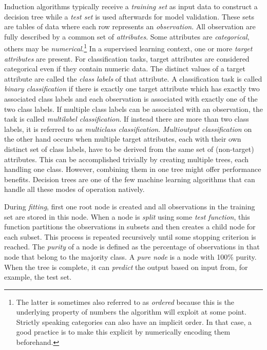 Induction algorithms typically receive a \emph{training set} as input data to construct a decision tree while a \emph{test set} is used afterwards for model validation. These sets are tables of data where each row represents an \emph{observation}. All observation are fully described by a common set of \emph{attributes}. Some attributes are \emph{categorical}, others may be \emph{numerical}.\footnote{The latter is sometimes also referred to as \emph{ordered} because this is the underlying property of numbers the algorithm will exploit at some point. Strictly speaking categories can also have an implicit order. In that case, a good practice is to make this explicit by numerically encoding them beforehand.} In a supervised learning context, one or more \emph{target attributes} are present. For classification tasks, target attributes are considered categorical even if they contain numeric data. The distinct values of a target attribute are called the \emph{class labels} of that attribute. A classification task is called \emph{binary classification} if there is exactly one target attribute which has exactly two associated class labels and each observation is associated with exactly one of the two class labels. If multiple class labels can be associated with an observation, the task is called \emph{multilabel classification}. If instead there are more than two class labels, it is referred to as \emph{multiclass classification}. \emph{Multioutput classification} on the other hand occurs when multiple target attributes, each with their own distinct set of class labels, have to be derived from the same set of (non-target) attributes. This can be accomplished trivially by creating multiple trees, each handling one class. However, combining them in one tree might offer performance benefits. Decision trees are one of the few machine learning algorithms that can handle all these modes of operation natively.

During \emph{fitting}, first one root node is created and all observations in the training set are stored in this node. When a node is \emph{split} using some \emph{test function}, this function partitions the observations in subsets and then creates a child node for each subset. This process is repeated recursively until some stopping criterion is reached. The \emph{purity} of a node is defined as the percentage of observations in that node that belong to the majority class. A \emph{pure node} is a node with 100\% purity. When the tree is complete, it can \emph{predict} the output based on input from, for example, the test set.

